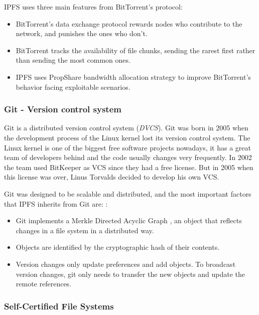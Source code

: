 IPFS uses three main features from BitTorrent's protocol\cite{benet2014ipfs}:
\begin{itemize}
\item BitTorrent's data exchange protocol rewards nodes who contribute to the
  network, and punishes the ones who don't.
\item BitTorrent tracks the availability of file chunks, sending the rarest
  first rather than sending the most common ones.
\item IPFS uses PropShare\cite{levin2008bittorrent} bandwidth allocation
  strategy to improve BitTorrent's behavior facing exploitable scenarios.
\end{itemize}

\subsubsection*{Git - Version control system}
\label{tech:sec:ipfs:git}
Git is a distributed version control system (\emph{DVCS})\cite{torvalds2010git}.
Git was born in 2005 when the development process of the Linux kernel lost its
version control system. The Linux kernel is one of the biggest free software
projects nowadays, it has a great team of developers behind and the code usually
changes very frequently. In 2002 the team used BitKeeper as VCS since they had a
free license. But in 2005 when this license was over, Linus Torvalds decided to
develop his own VCS\cite{spinellis2005version}.

Git was designed to be scalable and distributed, and the most important factors
that IPFS inherits from Git are: \cite{benet2014ipfs}:

\begin{itemize}
\item Git implements a Merkle Directed Acyclic Graph
  \cite{bleichenbacher1994directed}, an object that reflects changes in a file
  system in a distributed way.
\item Objects are identified by the cryptographic hash of their contents.
\item Version changes only update preferences and add objects. To broadcast
  version changes, git only needs to transfer the new objects and update the
  remote references.
\end{itemize}

\subsubsection*{Self-Certified File Systems}
\label{tech:sec:ipfs:scfs}

